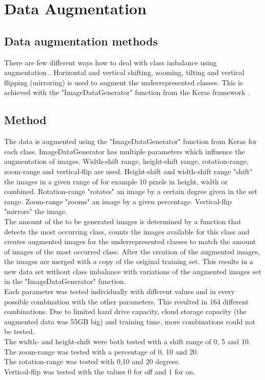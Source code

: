 \section{Data Augmentation}
\subsection{Data augmentation methods}
There are few different ways how to deal with class imbalance using augmentation \cite{bloem2020methology1}. Horizontal and vertical shifting, zooming, tilting and vertical flipping (mirroring) is used to augment the underrepresented classes. This is achieved with the "ImageDataGenerator" function from the Keras framework \cite{imagepreprocessing-kerasdocumentation}. \\


\subsection{Method}
The data is augmented using the "ImageDataGenerator" function from Keras for each class. ImageDataGenerator has multiple parameters which influence the augmentation of images. Width-shift range, height-shift range, rotation-range, zoom-range and vertical-flip are used. Height-shift and width-shift range "shift" the images in a given range of for example 10 pixels in height, width or combined. Rotation-range "rotates" an image by a certain degree given in the set range. Zoom-range "zooms" an image by a given percentage. Vertical-flip "mirrors" the image.\\
The amount of the to be generated images is determined by a function that detects the most occurring class, counts the images available for this class and creates augmented images for the underrepresented classes to match the amount of images of the most occurred class. After the creation of the augmented images, the images are merged with a copy of the original training set. This results in a new data set without class imbalance with variations of the augmented images set in the "ImageDataGenerator" function.\\
Each parameter was tested individually with different values and in every possible combination with the other parameters. This resulted in 164 different combinations. Due to limited hard drive capacity, cloud storage capacity (the augmented data was 55GB big) and training time, more combinations could not be tested. \\
The width- and height-shift were both tested with a shift range of 0, 5 and 10.\\
The zoom-range was tested with a percentage of 0, 10 and 20. \\
The rotation-range was tested with 0,10 and 20 degrees. \\
Vertical-flip was tested with the values 0 for off and 1 for on.\\

